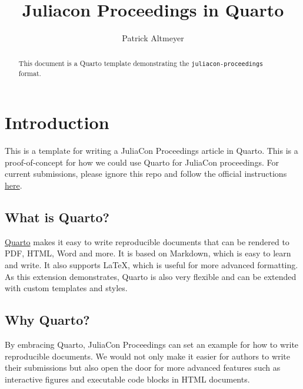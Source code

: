 \documentclass{juliacon}
\title{Juliacon Proceedings in Quarto}
\author[1]{Patrick Altmeyer}
\affil[1]{Delft University of Technology}
\date{}
\begin{document}
\maketitle

\begin{abstract}

This document is a Quarto template demonstrating the
\texttt{juliacon-proceedings} format.
\end{abstract}



\setcounter{page}{1}

\section{Introduction}\label{sec-intro}

This is a template for writing a JuliaCon Proceedings article in Quarto.
This is a proof-of-concept for how we could use Quarto for JuliaCon
proceedings. For current submissions, please ignore this repo and follow
the official instructions
\href{https://github.com/JuliaCon/JuliaConSubmission.jl}{here}.

\subsection{What is Quarto?}\label{what-is-quarto}

\href{https://quarto.org/}{Quarto} makes it easy to write reproducible
documents that can be rendered to PDF, HTML, Word and more. It is based
on Markdown, which is easy to learn and write. It also supports LaTeX,
which is useful for more advanced formatting. As this extension
demonstrates, Quarto is also very flexible and can be extended with
custom templates and styles.

\subsection{Why Quarto?}\label{why-quarto}

By embracing Quarto, JuliaCon Proceedings can set an example for how to
write reproducible documents. We would not only make it easier for
authors to write their submissions but also open the door for more
advanced features such as interactive figures and executable code blocks
in HTML documents.
\end{document}
